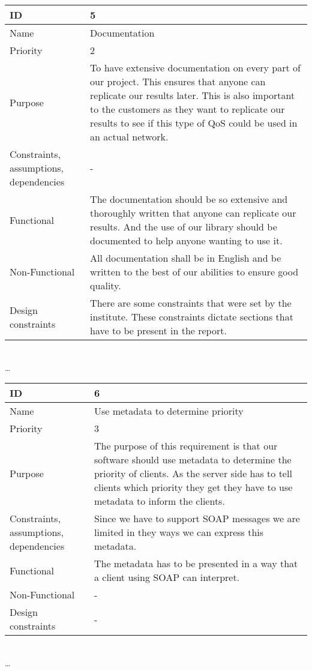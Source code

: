 \begin{center}
	\begin{tabular}{| p{4cm} | p{8cm} |}
		\hline
		ID & 5 \\
		\hline
		Name & Documentation  \\
		\hline
		Priority & 2 \\
		\hline
		Purpose & To have extensive documentation on every part of our project. This ensures that anyone can replicate our results later. This is also important to the customers as they want to replicate our results to see if this type of QoS could be used in an actual network.\\
		\hline 
		Constraints, assumptions, dependencies & -\\
		\hline  
		Functional & The documentation should be so extensive and thoroughly written that anyone can replicate our results. And the use of our library should be documented to help anyone wanting to use it. \\
		\hline
		Non-Functional & All documentation shall be in English and be written to the best of our abilities to ensure good quality. \\ 
		\hline
		Design constraints & There are some constraints that were set by the institute. These constraints dictate sections that have to be present in the report. \\
		\hline
	\end{tabular}
	\\  \ldots  \\

	\begin{tabular}{| p{4cm} | p{8cm} |}
		\hline
		ID & 6 \\
		\hline
		Name & Use metadata to determine priority  \\
		\hline
		Priority & 3 \\
		\hline
		Purpose & The purpose of this requirement is that our software should use metadata to determine the priority of clients. As the server side has to tell clients which priority they get they have to use metadata to inform the clients. \\
		\hline 
		Constraints, assumptions, dependencies & Since we have to support SOAP messages we are limited in they ways we can express this metadata. \\
		\hline  
		Functional & The metadata has to be presented in a way that a client using SOAP can interpret. \\
		\hline
		Non-Functional & -\\ 
		\hline
		Design constraints & -\\
		\hline
	\end{tabular}
	\\  \ldots  \\


\end{center}

